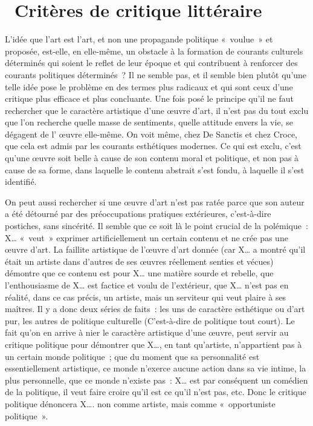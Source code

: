 \documentclass[french,twoside]{book} %
\begin{document}
\section[{ Critères de critique littéraire}]{ Critères de critique littéraire}
\noindent L'idée que l’art est l’art, et non une propagande politique « voulue » et proposée, est-elle, en elle-même, un obstacle à la formation de courants culturels déterminés qui soient le reflet de leur époque et qui contribuent à renforcer des courants politiques déterminés ? Il ne semble pas, et il semble bien plutôt qu’une telle idée pose le problème en des termes plus radicaux et qui sont ceux d’une critique plus efficace et plus concluante. Une fois posé le principe qu’il ne faut rechercher que le caractère artistique d’une œuvre d’art, il n’est pas du tout exclu que l’on recherche quelle masse de sentiments, quelle attitude envers la vie, se dégagent de l’ œuvre elle-même. On voit même, chez De Sanctis et chez Croce, que cela est admis par les courants esthétiques modernes. Ce qui est exclu, c’est qu’une œuvre soit belle à cause de son contenu moral et politique, et non pas à cause de sa forme, dans laquelle le contenu abstrait s’est fondu, à laquelle il s’est identifié.\par
On peut aussi rechercher si une œuvre d’art n’est pas ratée parce que son auteur a été détourné par des préoccupations pratiques extérieures, c’est-à-dire postiches, sans sincérité. Il semble que ce soit là le point crucial de la polémique : X… « veut » exprimer artificiellement un certain contenu et ne crée pas une œuvre d’art. La faillite artistique de l’œuvre d’art donnée (car X… a montré qu’il était un artiste dans d’autres de ses œuvres réellement senties et vécues) démontre que ce contenu est pour X… une matière sourde et rebelle, que l’enthousiasme de X… est factice et voulu de l’extérieur, que X… n’est pas en réalité, dans ce cas précis, un artiste, mais un serviteur qui veut plaire à ses maîtres. Il y a donc deux séries de faits : les uns de caractère esthétique ou d’art pur, les autres de politique culturelle (C’est-à-dire de politique tout court). Le fait qu’on en arrive à nier le caractère artistique d’une œuvre, peut servir au critique politique pour démontrer que X…, en tant qu’artiste, n’appartient pas à un certain monde politique ; que du moment que sa personnalité est essentiellement artistique, ce monde n’exerce aucune action dans sa vie intime, la plus personnelle, que ce monde n’existe pas : X… est par conséquent un comédien de la politique, il veut faire croire qu’il est ce qu’il n’est pas, etc. Donc le critique politique dénoncera X…. non comme artiste, mais comme « opportuniste politique ».\par
\end{document}
